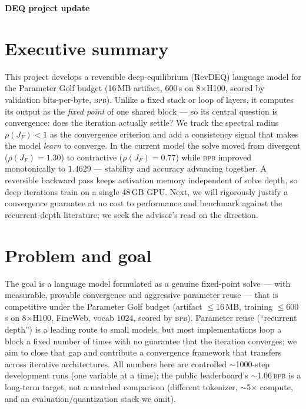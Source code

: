 \documentclass[11pt]{article}
\newcommand{\rhoF}{\rho(J_F)}
\newcommand{\bpb}{\textsc{bpb}}
\begin{document}
\begin{center}
{\Large\bfseries DEQ project update}
\end{center}
\vspace{0.3em}

\section{Executive summary}

This project develops a reversible deep-equilibrium (RevDEQ) language model for the
Parameter Golf budget (16\,MB artifact, 600\,s on 8$\times$H100, scored by
validation bits-per-byte, \bpb). Unlike a fixed stack or loop of layers, it computes
its output as the \emph{fixed point} of one shared block --- so its central question
is convergence: does the iteration actually settle? We track the spectral radius
$\rhoF<1$ as the convergence criterion and add a consistency signal that makes the
model \emph{learn} to converge. In the current model the solve moved from divergent
($\rhoF=1.30$) to contractive ($\rhoF=0.77$) while \bpb{} improved monotonically to
$1.4629$ --- stability and accuracy advancing together. A reversible backward pass
keeps activation memory independent of solve depth, so deep iterations train on a
single 48\,GB GPU. Next, we will rigorously justify a convergence guarantee at no
cost to performance and benchmark against the recurrent-depth literature; we seek the
advisor's read on the direction.

\section{Problem and goal}

The goal is a language model formulated as a genuine fixed-point solve --- with
measurable, provable convergence and aggressive parameter reuse --- that is
competitive under the Parameter Golf budget (artifact $\le 16$\,MB, training
$\le 600$\,s on 8$\times$H100, FineWeb, vocab $1024$, scored by \bpb). Parameter
reuse (``recurrent depth'') is a leading route to small models, but most
implementations loop a block a fixed number of times with no guarantee that the
iteration converges; we aim to close that gap and contribute a convergence framework
that transfers across iterative architectures. All numbers here are controlled
$\sim$1000-step development runs (one variable at a time); the public leaderboard's
$\sim$1.06\,\bpb{} is a long-term target, not a matched comparison (different
tokenizer, $\sim$5$\times$ compute, and an evaluation/quantization stack we omit).
\end{document}
